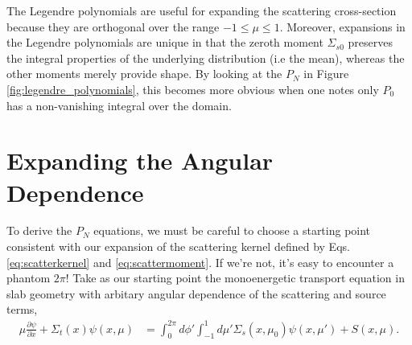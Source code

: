The Legendre polynomials are useful for expanding the scattering cross-section 
because they are orthogonal over the range $-1 \leq \mu \leq 1$.  Moreover, 
expansions in the Legendre polynomials are unique in that the zeroth moment 
$\Sigma_{s0}$ preserves the integral properties of the underlying distribution 
(i.e the mean), whereas the other moments merely provide shape.  By looking at 
the $P_N$ in Figure \ref{fig:legendre_polynomials}, this becomes more obvious 
when one notes only $P_0$ has a non-vanishing integral over the domain.

\section*{Expanding the Angular Dependence}

To derive the $P_N$ equations, we must be careful to choose a starting point 
consistent with our expansion of the scattering kernel defined by Eqs. 
\ref{eq:scatterkernel} and \ref{eq:scattermoment}.  If we're not, it's easy to 
encounter a phantom $2\pi$!  Take as our starting point the monoenergetic 
transport equation in slab geometry with arbitary angular dependence of the 
scattering and source terms,
\begin{equation}
\begin{split}
 \mu \frac{\partial \psi}{\partial x} + \Sigma_t(x)\psi(x,\mu) &= 
    \int^{2\pi}_0 d\phi' \int^1_{-1} d\mu' \Sigma_s(x,\mu_0)\psi(x,\mu') 
      + S(x,\mu)  .
\end{split}
 \label{eq:slabtransportequationgeneral}
\end{equation}

